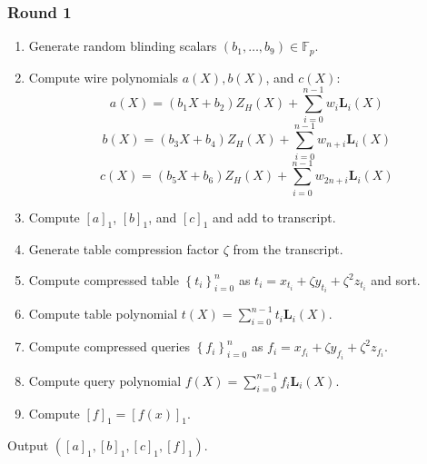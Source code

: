 \documentclass[fleqn]{article}
\begin{document}
			\subsubsection*{Round 1}
				\begin{enumerate}
					\item Generate random blinding scalars $(b_1,\ldots,b_9)\in \mathbb{F}_p$.
	
					\item Compute wire polynomials $a(X), b(X)$, and $c(X)$:         
					\[a(X) = (b_1X+b_2)Z_H(X)+\sum_{i=0}^{n-1} w_i\textbf{L}_i(X)\]					                
					\[b(X) = (b_3X+b_4)Z_H(X)+\sum_{i=0}^{n-1} w_{n+i}\textbf{L}_i(X)\]					                
					\[c(X) = (b_5X+b_6)Z_H(X)+\sum_{i=0}^{n-1} w_{2n+i}\textbf{L}_i(X)\]				                
					\item Compute $[a]_1$, $[b]_1$, and $[c]_1$ and add to transcript.
					                
					\item Generate table compression factor $\zeta$ from the transcript.
					                
					\item Compute compressed table $\left\{t_i\right\}_{i=0}^n$ as $t_i = x_{t_i}+\zeta y_{t_i}+\zeta^2z_{t_i}$ and sort.
					                
					\item Compute table polynomial $t(X) = \sum_{i=0}^{n-1}t_i \textbf{L}_i(X)$.
					                
					\item Compute compressed queries $\left\{f_i\right\}_{i=0}^n$ as $f_i = x_{f_i}+\zeta y_{f_i}+\zeta^2z_{f_i}$.
					                
					\item Compute query polynomial $f(X) = \sum_{i=0}^{n-1}f_i\textbf{L}_i(X)$.
					                
					\item Compute $[f]_1 = [f(x)]_1$.
				\end{enumerate}
					                
					Output $([a]_1, [b]_1, [c]_1, [f]_1)$.
            
\end{document}
